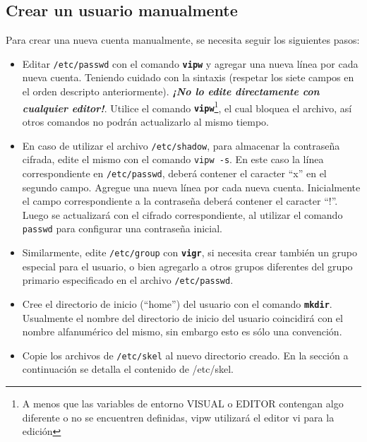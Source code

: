 \documentclass[12pt]{article}
\begin{document}
\subsection*{Crear un usuario manualmente}

Para crear una nueva cuenta manualmente, se necesita seguir los siguientes pasos:

\begin{itemize}
	
	\item  Editar \texttt{/etc/passwd} con el comando 
	\texttt{\textbf{vipw}} y agregar una nueva línea por cada nueva cuenta.
	Teniendo cuidado con la sintaxis (respetar los siete campos en el orden 
	descripto anteriormente).  \textit{\bf ¡No lo edite directamente
	con cualquier editor!}. Utilice el comando \texttt{\textbf{vipw}}\footnote{
	A menos que las variables de entorno VISUAL o EDITOR contengan algo diferente o 
	no se encuentren definidas, vipw utilizará el editor vi para la edición}, 
	el cual bloquea el archivo, así otros comandos no podrán actualizarlo al mismo tiempo. 

	\item En caso de utilizar el archivo \texttt{/etc/shadow}, para almacenar
	la contraseña cifrada, edite el mismo con el comando \texttt{vipw -s}. En este
	caso la línea correspondiente en \texttt{/etc/passwd}, deberá contener el caracter
	``x'' en el segundo campo. Agregue una nueva línea por cada nueva cuenta. Inicialmente
	el campo correspondiente a la contraseña deberá contener el caracter ``!''. Luego 
	se actualizará con el cifrado correspondiente, al utilizar el comando \texttt{passwd} para 
	configurar una contraseña inicial.  

	\item Similarmente, edite \texttt{/etc/group} con
	\texttt{\textbf{vigr}}, si necesita crear también un
	grupo especial para el usuario, o bien agregarlo a otros grupos
	diferentes del grupo primario especificado en el archivo \texttt{/etc/passwd}.  
        
	\item Cree el directorio de inicio (``home'') del
	usuario con el comando \texttt{\textbf{mkdir}}. Usualmente el nombre del directorio
	de inicio del usuario coincidirá con el nombre alfanumérico del mismo, sin embargo 
	esto es sólo una convención. 

	\item Copie los archivos de \texttt{/etc/skel} al nuevo directorio creado. 
	En la sección a continuación se detalla el contenido de /etc/skel. 


\end{itemize}
\end{document}
